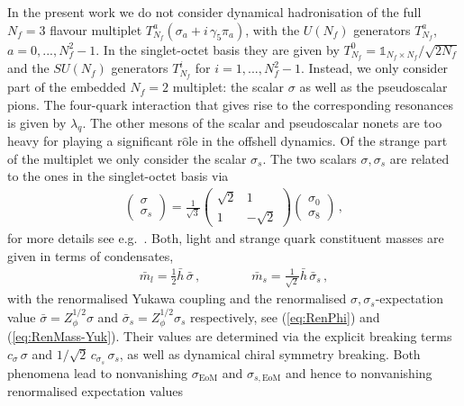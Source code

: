 \documentclass[%
reprint,
superscriptaddress,
showpacs,preprintnumbers,
 amsmath,amssymb,
 aps,
prd,
]{revtex4-1}
\def\eq#1{(\ref{#1})}
\begin{document}
In the present work we do not consider dynamical hadronisation of the
full $N_f=3$ flavour multiplet
$T^a_{N_f}(\sigma_a + i\,\gamma_5 \pi_a)$, with the $U(N_f)$
generators $T^a_{N_f}$, $a=0,..., N_f^2-1$. In the singlet-octet basis
they are given by $T^0_{N_f}=\mathbb{1}_{N_f\times N_f}/\sqrt{2 N_f}$
and the $SU(N_f)$ generators $T^i_{N_f}$ for $i=1,...,
N_f^2-1$. Instead, we only consider part of the embedded $N_f=2$
multiplet: the scalar $\sigma$ as well as the pseudoscalar pions. The
four-quark interaction that gives rise to the corresponding resonances
is given by $\lambda_{q}$. The other mesons of the scalar and
pseudoscalar nonets are too heavy for playing a significant
r$\hat{\textrm{o}}$le in the offshell dynamics. Of the strange part of
the multiplet we only consider the scalar $\sigma_s$. The two scalars
$\sigma,\sigma_s$ are related to the ones in the singlet-octet basis
via
%
\begin{align}\label{eq:SigmaSigmas}
  \begin{pmatrix} \sigma \\ \sigma_s \end{pmatrix}  =
  \frac{1}{\sqrt{3}} \begin{pmatrix} \sqrt{2} &  1
      \\ 1 & -\sqrt{2} \end{pmatrix}
  \begin{pmatrix} \sigma_0 \\ \sigma_8 \end{pmatrix} \,,
\end{align}
%
for more details see e.g.\ \cite{Schaefer:2008hk, Herbst:2013ufa,
  Mitter:2013fxa, Rennecke:2016tkm, Fu:2018qsk, Wen:2018nkn}. Both,
light and strange quark constituent masses are given in terms of
condensates,
%
\begin{align}\label{eq:ml+s_const}
  \bar m_l =\frac12 \bar h \,\bar \sigma\,,\qquad  \qquad  \bar m_s =
  \frac{1}{\sqrt{2}} \bar h\, \bar \sigma_s\,,   
\end{align}
with the renormalised Yukawa coupling and the renormalised
$\sigma,\sigma_s$-expectation value $\bar \sigma= Z_\phi^{1/2} \sigma$
and $\bar \sigma_s= Z_{\phi}^{1/2} \sigma_s$ respectively, see
\eq{eq:RenPhi} and \eq{eq:RenMass-Yuk}. Their values are determined
via the explicit breaking terms $c_\sigma\,\sigma$ and
$1/\sqrt{2}\, c_{\sigma_s}\,\sigma_s$, as well as dynamical chiral
symmetry breaking. Both phenomena lead to nonvanishing
$\sigma_\textrm{EoM}$ and $\sigma_{s,\textrm{EoM}}$ and hence to
nonvanishing renormalised expectation values
\end{document}
